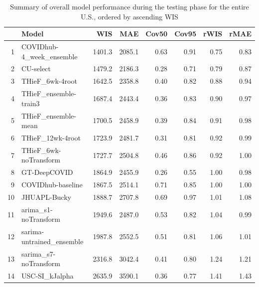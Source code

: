 \documentclass[12pt]{article}
\begin{document}
\begin{table}[h]
\begin{center}
\caption{Summary of overall model performance during the testing phase for the entire U.S., ordered by ascending WIS}
\label{tab:table_overall_us}
\begin{tabular}{rlrrrrrr}
  \hline
 & Model & WIS & MAE & Cov50 & Cov95 & rWIS & rMAE \\ 
  \hline
1 & COVIDhub-4\_week\_ensemble & 1401.3 & 2085.1 & 0.63 & 0.91 & 0.75 & 0.83 \\ 
  2 & CU-select & 1479.2 & 2186.3 & 0.28 & 0.71 & 0.79 & 0.87 \\ 
  3 & THieF\_6wk-4root & 1642.5 & 2358.8 & 0.40 & 0.82 & 0.88 & 0.94 \\ 
  4 & THieF\_ensemble-train3 & 1687.4 & 2443.4 & 0.36 & 0.83 & 0.90 & 0.97 \\ 
  5 & THieF\_ensemble-mean & 1700.5 & 2458.9 & 0.39 & 0.84 & 0.91 & 0.98 \\ 
  6 & THieF\_12wk-4root & 1723.9 & 2481.7 & 0.31 & 0.81 & 0.92 & 0.99 \\ 
  7 & THieF\_6wk-noTransform & 1727.7 & 2504.8 & 0.46 & 0.86 & 0.92 & 1.00 \\ 
  8 & GT-DeepCOVID & 1864.9 & 2455.9 & 0.26 & 0.55 & 1.00 & 0.98 \\ 
  9 & COVIDhub-baseline & 1867.5 & 2514.1 & 0.71 & 0.85 & 1.00 & 1.00 \\ 
  10 & JHUAPL-Bucky & 1888.7 & 2707.8 & 0.69 & 0.97 & 1.01 & 1.08 \\ 
  11 & arima\_s1-noTransform & 1949.6 & 2487.0 & 0.53 & 0.82 & 1.04 & 0.99 \\ 
  12 & sarima-untrained\_ensemble & 1987.8 & 2552.5 & 0.51 & 0.81 & 1.06 & 1.01 \\ 
  13 & sarima\_s7-noTransform & 2316.8 & 3042.4 & 0.41 & 0.80 & 1.24 & 1.21 \\ 
  14 & USC-SI\_kJalpha & 2635.9 & 3590.1 & 0.36 & 0.77 & 1.41 & 1.43 \\ 
   \hline
\end{tabular}\end{center}
\end{table}
\end{document}
